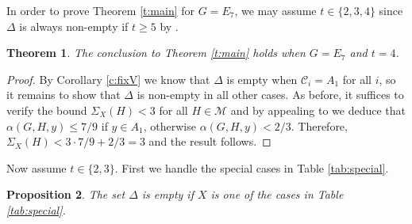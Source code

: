 \documentclass[twoside,a4paper,reqno,11pt]{amsart}
\renewcommand{\a}{\alpha}
\newcommand{\<}{\langle}
\renewcommand{\>}{\rangle}
\newcommand{\leqs}{\leqslant}
\newcommand{\geqs}{\geqslant}
\renewcommand{\:}{\colon}
\theoremstyle{plain}
\newtheorem{thm}{Theorem}[section]
\newtheorem{prop}[thm]{Proposition}
\theoremstyle{definition}
\begin{document}
In order to prove Theorem \ref{t:main} for $G = E_7$, we may assume $t \in \{2,3,4\}$ since $\Delta$ is always non-empty if $t \geqs 5$ by \cite[Theorem 7]{BGG1}.

\begin{thm}\label{t:e7_4}
The conclusion to Theorem \ref{t:main} holds when $G = E_7$ and $t=4$.
\end{thm}

\begin{proof}
By Corollary \ref{c:fixV} we know that $\Delta$ is empty when $\mathcal{C}_i = A_1$ for all $i$, so it remains to show that $\Delta$ is non-empty in all other cases. As before, it suffices to verify the bound $\Sigma_X(H)<3$ for all $H \in \mathcal{M}$ and by appealing to  \cite[Theorem 3.1]{BGG1} we deduce that $\a(G,H,y) \leqs 7/9$ if $y \in A_1$, otherwise $\a(G,H,y)<2/3$. Therefore, $\Sigma_X(H) < 3\cdot 7/9+2/3 = 3$ and the result follows.
\end{proof}

Now assume $t \in \{2,3\}$. First we handle the special cases in Table \ref{tab:special}.

\begin{prop}\label{p:e7_00}
The set $\Delta$ is empty if $X$ is one of the cases in Table \ref{tab:special}.
\end{prop}
\end{document}
